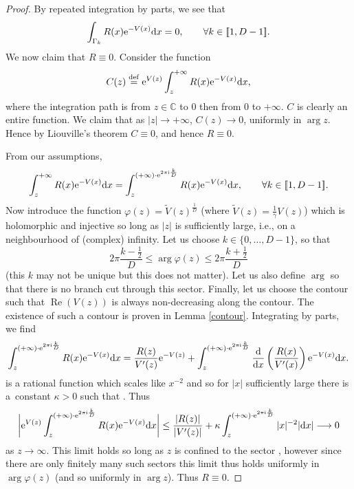 \documentclass[pdftex]{sigma}
\numberwithin{equation}{section}
\begin{document}
\begin{proof}
By repeated integration by parts, we see that
\begin{align*}
\int_{\Gamma_k} R(x) {\rm e}^{-V(x)} {\rm d}x = 0,\qquad \forall k \in [\![ 1,D-1]\!].
\end{align*}
We now claim that $R \equiv 0$. Consider the function
\begin{equation*}
C(z) \overset{\mathrm{def}}{=} {\rm e}^{V(z)}\int_z^{+\infty} R(x) {\rm e}^{-V(x)} {\rm d}x,
\end{equation*}
where the integration path is from $z \in \mathbb{C}$ to $0$ then from $0$ to $+\infty$. $C$ is clearly an entire function. We claim that as $|z| \to +\infty$, $C(z) \to 0$, uniformly in $\operatorname{arg} z $. Hence by Liouville's theorem $C \equiv 0$, and hence $R \equiv 0$.

From our assumptions,
\begin{align*}
\int_z^{+\infty} R(x) {\rm e}^{-V(x)} {\rm d}x = \int_z^{(+\infty) \cdot {\rm e}^{2\pi {\rm i} \frac{k}{D}}} R(x) {\rm e}^{-V(x)} {\rm d}x,\qquad \forall k \in [\![ 1,D-1]\!].
\end{align*}
Now introduce the function $\varphi(z) = \tilde{V}(z)^\frac{1}{D}$ \big(where $\tilde{V}(z) = \frac{1}{\gamma}V(z)$\big) which is holomorphic and injective so long as $|z|$ is sufficiently large, i.e., on a neighbourhood of (complex) infinity. Let us choose $k \in \{0, \dots, D-1\}$, so that
\[
 2\pi \frac{k-\frac{1}{2}}{D} \leq \arg \varphi(z) \leq 2\pi \frac{k+\frac{1}{2}}{D}
\]
 (this $k$ may not be unique but this does not matter). Let us also define $\arg$ so that there is no branch cut through this sector. Finally, let us choose the contour such that $\operatorname{Re} (V(z))$ is always non-decreasing along the contour. The existence of such a contour is proven in Lemma \ref{contour}. Integrating by parts, we find
\begin{align*}
\int_z^{(+\infty) \cdot {\rm e}^{2\pi {\rm i} \frac{k}{D}}} R(x) {\rm e}^{-V(x)} {\rm d}x = \frac{R(z)}{V^\prime(z)} {\rm e}^{-V(z)}+ \int_z^{(+\infty) \cdot {\rm e}^{2\pi {\rm i} \frac{k}{D}}} \frac{\rm d}{{\rm d}x}\left( \frac{R(x)}{V^\prime(x)} \right) {\rm e}^{-V(x)} {\rm d}x.
\end{align*}
 is a rational function which scales like $x^{-2}$ and so for $|x|$ sufficiently large there is a~constant $\kappa>0$ such that . Thus
\begin{equation*}
\bigg|{\rm e}^{V(z)} \int_z^{(+\infty) \cdot {\rm e}^{2\pi {\rm i} \frac{k}{D}}} R(x) {\rm e}^{-V(x)} {\rm d}x\bigg| \leq \frac{|R(z)|}{|V^\prime(z)|}+ \kappa\int_z^{(+\infty) \cdot {\rm e}^{2\pi {\rm i} \frac{k}{D}}}|x|^{-2} |{\rm d}x| \longrightarrow 0
\end{equation*}
as $z \to \infty$. This limit holds so long as $z$ is confined to the sector , however since there are only finitely many such sectors this limit thus holds uniformly in $\operatorname{arg} \varphi(z)$ (and so uniformly in $\operatorname{arg} z$). Thus $R \equiv 0$.


\end{proof}
\end{document}
